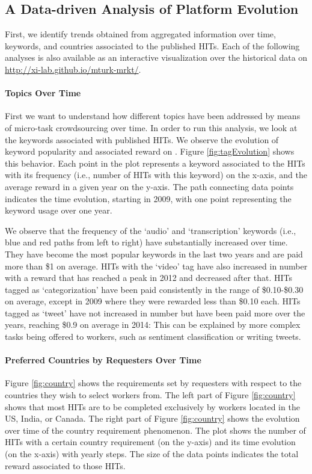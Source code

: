 \subsection{A Data-driven Analysis of Platform Evolution}
First, we identify trends obtained from aggregated information over time, keywords, and countries associated to the published HITs.  Each of the following analyses is also available as an interactive visualization over the historical data on \url{http://xi-lab.github.io/mturk-mrkt/}.
\paragraph{Topics  Over Time}
First we want to understand how different topics have been addressed by means of micro-task crowdsourcing over time.
In order to run this analysis, we look at the keywords associated with published HITs. We observe the evolution of keyword popularity and associated reward on \amt{}. 
Figure \ref{fig:tagEvolution} shows this behavior. Each point in the plot represents a keyword associated to the HITs with its frequency (i.e., number of HITs with this keyword) on the x-axis, and the average reward in a given year on the y-axis. The path connecting data points indicates the time evolution, starting in 2009, with one point representing the keyword usage over one year.

We observe that the frequency of the `audio' and `transcription' keywords (i.e., blue and red paths from left to right) have substantially increased over time. They have become the most popular keywords in the last two years and are paid more than \$1 on average.
HITs with the `video' tag have also increased in number with a reward that has reached a peak in 2012 and decreased after that.
HITs tagged as `categorization' have been paid consistently in the range of \$0.10-\$0.30 on average, except in 2009 where they were rewarded less than \$0.10 each.
HITs tagged as `tweet' have not increased in number but have been paid more over the years, reaching \$0.9 on average in 2014: This can be explained by more complex tasks being offered to workers, such as sentiment classification or writing tweets.




\paragraph{Preferred Countries by Requesters Over Time}
Figure \ref{fig:country} shows the requirements set by requesters with respect to the countries they wish to select workers from. The left part of Figure \ref{fig:country} shows that most HITs are to be completed exclusively by workers located in the US, India, or Canada. The right part of Figure \ref{fig:country} shows the evolution over time of the country requirement phenomenon.
The plot shows the number of HITs with a certain country requirement (on the y-axis) and its time evolution (on the x-axis) with yearly steps. The size of the data points indicates the total reward associated to those HITs.

